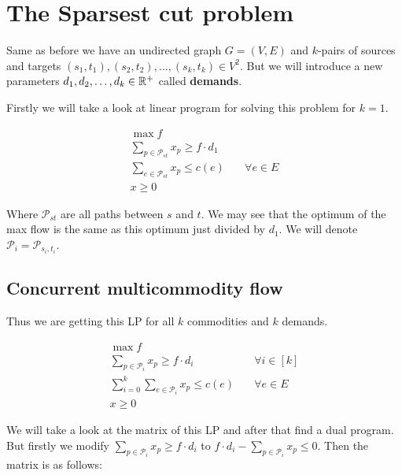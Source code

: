 \chapter{The Sparsest cut problem}

Same as before we have an undirected graph $G = (V,E)$ and $k$-pairs of sources and targets $(s_{1},t_{1}), (s_{2}, t_{2}), \dots, (s_{k}, t_{k}) \in V^{2}$. But we will introduce a new parameters $d_{1}, d_{2}, \dots, d_{k} \in \mathbb{R}^{+}$ called \textbf{demands}.

Firstly we will take a look at linear program for solving this problem for $k = 1$.

$$
\begin{aligned}
	\max f \\
	\sum_{p \in \mathcal{P}_{st}} x_{p} \geq f \cdot d_{1} \\
	\sum_{e \in \mathcal{P}_{st}} x_{p} \leq c(e) & \quad \forall e \in E\\
	x \geq 0
\end{aligned}
$$

Where $\mathcal{P}_{st}$ are all paths between $s$ and $t$. We may see that the optimum of the max flow is the same as this optimum just divided by $d_{1}$. We will denote $\mathcal{P}_{i} = \mathcal{P}_{s_{i}, t_{i}}$.

\section{Concurrent multicommodity flow}

Thus we are getting this LP for all $k$ commodities and $k$ demands.

$$
\begin{aligned}
	\max f \\
	\sum_{p \in \mathcal{P}_{i}} x_{p} \geq f \cdot d_{i} & \quad \forall i \in [k]\\
	\sum_{i = 0}^{k} \sum_{e \in \mathcal{P}_{i}} x_{p} \leq c(e) & \quad \forall e \in E\\
	x \geq 0
\end{aligned}
$$

We will take a look at the matrix of this LP and after that find a dual program. But firstly we modify $\sum_{p \in \mathcal{P}_{i}} x_{p} \geq f \cdot d_{i}$ to $f \cdot d_{i} - \sum_{p \in \mathcal{P}_{i}} x_{p} \leq 0$. Then the matrix is as follows:

